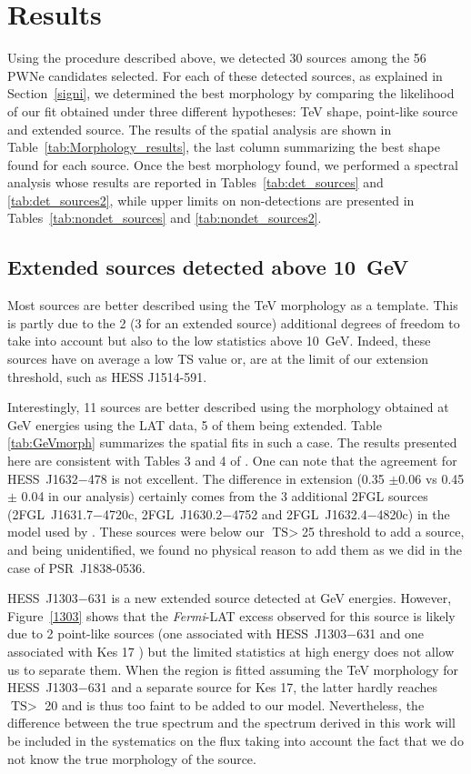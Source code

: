 \section{Results}
\label{res}

Using the procedure described above, we detected 30 sources among the 56 PWNe candidates selected. For each of these detected sources, as explained in Section~\ref{signi}, we determined the best morphology by comparing the likelihood of our fit obtained under three different hypotheses: TeV shape, point-like source and extended source. The results of the spatial analysis are shown in Table~\ref{tab:Morphology_results}, the last column summarizing the best shape found for each source. Once the best morphology found, we performed a spectral analysis whose results are reported in Tables~\ref{tab:det_sources} and \ref{tab:det_sources2}, while upper limits on non-detections are presented in Tables~\ref{tab:nondet_sources} and \ref{tab:nondet_sources2}.

\subsection{Extended sources detected above 10~GeV}
\label{morph_res}

Most sources are better described using the TeV morphology as a template. This is partly due to the 2 (3 for an extended source) additional degrees of freedom to take into account but also to the low statistics above 10~GeV. Indeed, these sources have on average a low TS value or, are at the limit of our extension threshold, such as HESS J1514-591.

Interestingly, 11 sources are better described using the morphology obtained at GeV energies using the LAT data, 5 of them being extended. Table \ref{tab:GeVmorph} summarizes the spatial fits in such a case. The results presented here are consistent with Tables 3 and 4 of \cite{2012arXiv1207.0027L}. One can note that the agreement for HESS~J1632$-$478 is not excellent. The difference in extension (0.35 $\pm 0.06$ vs 0.45 $\pm$ 0.04 in our analysis) certainly comes from the 3 additional 2FGL sources (2FGL~J1631.7$-$4720c, 2FGL~J1630.2$-$4752 and 2FGL~J1632.4$-$4820c) in the model used by \cite{2012arXiv1207.0027L}. These sources were below our $\text{TS}>$25 threshold to add a source, and being unidentified, we found no physical reason to add them as we did in the case of PSR~J1838-0536. 

HESS~J1303$-$631 is a new extended source detected at GeV energies. However, Figure~\ref{1303} shows that the \emph{Fermi}-LAT excess observed for this source is likely due to 2 point-like sources (one associated with HESS~J1303$-$631 and one associated with Kes 17 \citep{2011ApJ...740L..12W}) but the limited statistics at high energy does not allow us to separate them. When the region is fitted assuming the TeV morphology for HESS~J1303$-$631 and a separate source for Kes 17, the latter hardly reaches $\text{TS}>$ 20 and is thus too faint to be added to our model. Nevertheless, the difference between the true spectrum and the spectrum derived in this work will be included in the systematics on the flux taking into account the fact that we do not know the true morphology of the source.

